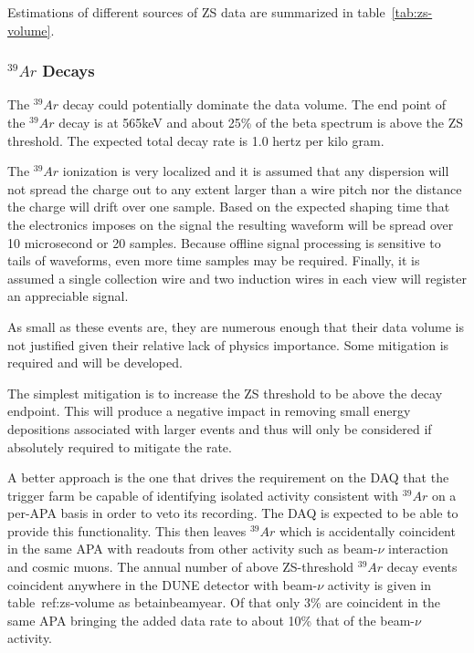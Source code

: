 Estimations of different sources of ZS data are summarized in table~\ref{tab:zs-volume}.

%

\subsubsection{$^{39}Ar$ Decays}

The $^{39}Ar$ decay could potentially dominate the data volume.
The end point of the $^{39}Ar$ decay is at 565keV and about
25\% of the beta spectrum is above the ZS threshold\cite{docdb3018}.
The expected total decay rate is
1.0 hertz per kilo gram\cite{bkds}.

The $^{39}Ar$ ionization is very localized and it is assumed that any
dispersion will not spread the charge out to any extent larger than a
wire pitch nor the distance the charge will drift over one sample.
Based on the expected shaping time that the electronics imposes on the
signal the resulting waveform will be spread over
10 microsecond or 20 samples.
Because offline signal processing is sensitive to tails of waveforms,
even more time samples may be required.
Finally, it is assumed a single collection wire and two induction
wires in each view will register an appreciable signal.

As small as these events are, they are numerous enough that their data
volume is not justified given their relative lack of physics importance.
Some mitigation is required and will be developed.

The simplest mitigation is to increase the ZS threshold to be above
the decay endpoint.
This will produce a negative impact in removing small energy
depositions associated with larger events and thus will only be
considered if absolutely required to mitigate the rate.

A better approach is the one that drives the requirement on the DAQ
that the trigger farm be capable of identifying isolated activity
consistent with $^{39}Ar$ on a per-APA basis in order to veto its
recording.
The DAQ is expected to be able to provide this functionality.
This then leaves $^{39}Ar$ which is accidentally coincident in the
same APA with readouts from other activity such as beam-$\nu$
interaction and cosmic muons.
The annual number of above ZS-threshold $^{39}Ar$ decay events
coincident anywhere in the DUNE detector with beam-$\nu$ activity is
given in table~{ref:zs-volume} as betainbeamyear.
Of that only 3\% are coincident in the same APA bringing the added
data rate to about 10\% that of the beam-$\nu$ activity.

